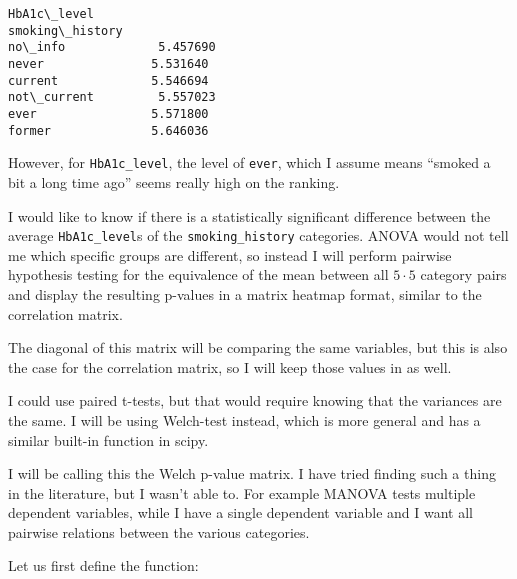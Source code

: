\documentclass[11pt]{article}
\makeatletter
\newcommand{\boxspacing}{\kern\kvtcb@left@rule\kern\kvtcb@boxsep}
\newcommand{\prompt}[4]{
        {\ttfamily\llap{{\color{#2}[#3]:\hspace{3pt}#4}}\vspace{-\baselineskip}}
    }
\makeatother
\begin{document}
            \begin{tcolorbox}[breakable, size=fbox, boxrule=.5pt, pad at break*=1mm, opacityfill=0]
\prompt{Out}{outcolor}{257}{\boxspacing}
\begin{Verbatim}[commandchars=\\\{\}]
                 HbA1c\_level
smoking\_history
no\_info             5.457690
never               5.531640
current             5.546694
not\_current         5.557023
ever                5.571800
former              5.646036
\end{Verbatim}
\end{tcolorbox}
        
    However, for \texttt{HbA1c\_level}, the level of \texttt{ever}, which I
assume means ``smoked a bit a long time ago'' seems really high on the
ranking.

I would like to know if there is a statistically significant difference
between the average \texttt{HbA1c\_level}s of the
\texttt{smoking\_history} categories. ANOVA would not tell me which
specific groups are different, so instead I will perform pairwise
hypothesis testing for the equivalence of the mean between all
\(5\cdot{}5\) category pairs and display the resulting p-values in a
matrix heatmap format, similar to the correlation matrix.

The diagonal of this matrix will be comparing the same variables, but
this is also the case for the correlation matrix, so I will keep those
values in as well.

I could use paired t-tests, but that would require knowing that the
variances are the same. I will be using Welch-test instead, which is
more general and has a similar built-in function in scipy.

I will be calling this the Welch p-value matrix. I have tried finding
such a thing in the literature, but I wasn't able to. For example MANOVA
tests multiple dependent variables, while I have a single dependent
variable and I want all pairwise relations between the various
categories.

Let us first define the function:
\end{document}
